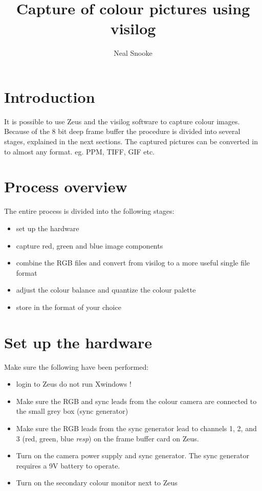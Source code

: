 \title{Capture of colour pictures using visilog}
\author{Neal Snooke}

\maketitle

\section{Introduction}

It is possible to use Zeus and the visilog software to capture 
colour images.  Because of the 8 bit deep frame buffer the 
procedure is divided into several stages, explained in the next sections.
The captured pictures can be converted in to almost any format. eg.
PPM, TIFF, GIF etc.

\section{Process overview}

The entire process is divided into the following stages:
\begin{itemize}
\item set up the hardware
\item capture red, green and blue image components
\item combine the RGB files and convert from visilog to a
      more useful single file format
\item adjust the colour balance and quantize the colour palette
\item store in the format of your choice
\end{itemize}

\section{Set up the hardware}

Make sure the following have been performed:
\begin{itemize}
\item login to Zeus do not run Xwindows !
\item Make sure the RGB and sync leads from the colour camera are connected
      to the small grey box (sync generator)
\item Make sure the RGB leads from the sync generator lead to
      channels 1, 2, and 3 (red, green, blue {\em resp}) on the frame
      buffer card on Zeus.  
\item Turn on the camera power supply and sync generator.  The sync generator
      requires a 9V battery to operate.
\item Turn on the secondary colour monitor next to Zeus 
\end{itemize}

